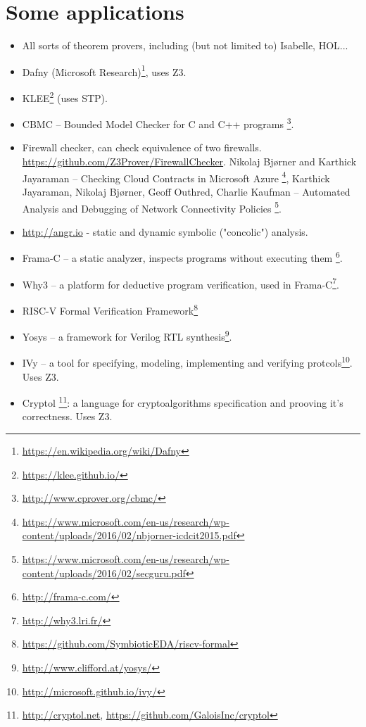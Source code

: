 \chapter{Some applications}

\begin{itemize}
\item All sorts of theorem provers, including (but not limited to) Isabelle, HOL...

\item Dafny (Microsoft Research)\footnote{\url{https://en.wikipedia.org/wiki/Dafny}}, uses Z3.

\item KLEE\footnote{\url{https://klee.github.io/}} (uses STP).

\item CBMC -- Bounded Model Checker for C and C++ programs
\footnote{\url{http://www.cprover.org/cbmc/}}.

\item Firewall checker, can check equivalence of two firewalls.
\url{https://github.com/Z3Prover/FirewallChecker}.
Nikolaj Bjørner and Karthick Jayaraman -- Checking Cloud Contracts in Microsoft Azure
\footnote{\url{https://www.microsoft.com/en-us/research/wp-content/uploads/2016/02/nbjorner-icdcit2015.pdf}},
Karthick Jayaraman, Nikolaj Bjørner, Geoff Outhred, Charlie Kaufman -- Automated Analysis and Debugging of Network Connectivity Policies
\footnote{\url{https://www.microsoft.com/en-us/research/wp-content/uploads/2016/02/secguru.pdf}}.

\item \url{http://angr.io} - static and dynamic symbolic ("concolic") analysis.

\item Frama-C -- a static analyzer, inspects programs without executing them
\footnote{\url{http://frama-c.com/}}.

\item Why3 -- a platform for deductive program verification,
used in Frama-C\footnote{\url{http://why3.lri.fr/}}.

\item RISC-V Formal Verification Framework\footnote{\url{https://github.com/SymbioticEDA/riscv-formal}}

\item Yosys -- a framework for Verilog RTL synthesis\footnote{\url{http://www.clifford.at/yosys/}}.

\item IVy -- a tool for specifying, modeling, implementing and verifying protcols\footnote{\url{http://microsoft.github.io/ivy/}}. Uses Z3.

\item Cryptol
\footnote{\url{http://cryptol.net}, \url{https://github.com/GaloisInc/cryptol}}:
a language for cryptoalgorithms specification and prooving it's correctness. Uses Z3.

\end{itemize}

